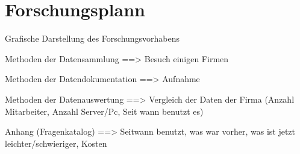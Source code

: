 \section{Forschungsplann}




Grafische Darstellung des Forschungsvorhabens 

Methoden der Datensammlung ==> Besuch einigen Firmen


Methoden der Datendokumentation  ==> Aufnahme


Methoden der Datenauswertung ==> Vergleich der Daten der Firma (Anzahl Mitarbeiter, Anzahl Server/Pc, Seit wann benutzt es)


Anhang (Fragenkatalog) ==> Seitwann benutzt, was war vorher, was ist jetzt leichter/schwieriger, Kosten